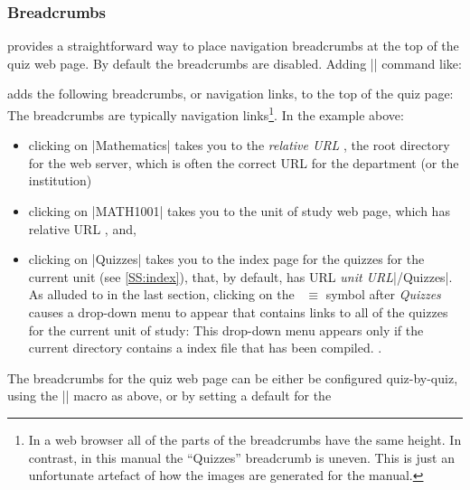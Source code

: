\documentclass[svgnames]{article}
\makeatletter
\newcommand\macroIndex[1]{%
  \lowercase{\def\temp{#1}}%
  \expandafter\index\expandafter{\temp@\textbackslash#1}%
}
\makeatother
\begin{document}
    \subsubsection{Breadcrumbs}\label{SS:breadcrumbs}

    \WebQuiz provides a straightforward way to place navigation breadcrumbs
    at the top of the quiz web page. By default the
    breadcrumbs are disabled. Adding \LatexCode|\BreadCrumbs| command
    like:
    \begin{latexcode}
    \end{latexcode}
    adds the following breadcrumbs, or navigation links,
    to the top of the quiz page:
    The breadcrumbs are typically navigation links\footnote{In a web browser all of the
    parts of the breadcrumbs have the same height. In contrast, in this
    manual the ``Quizzes'' breadcrumb is uneven. This is just an
    unfortunate artefact of how the images are generated for the manual.}.
    In the example above:
    \begin{itemize}
      \item clicking on \BashCode|Mathematics| takes you to the
      \textit{relative URL} \BashCode{/}, the root directory for the web
      server, which is often the correct URL for the department (or the
      institution)
      \item clicking on
      \BashCode|MATH1001| takes you to the
      unit of study web page, which has relative URL , and,
      \item clicking on \BashCode|Quizzes| takes you to the index page for
      the quizzes for the current unit (see \autoref{SS:index}), that, by
      default, has URL \textit{unit URL}\BashCode|/Quizzes|.  As alluded
      to in the last section, clicking on the~{\large\color{red} $\equiv$}
      symbol after \textit{Quizzes} causes a drop-down menu to appear that
      contains links to all of the quizzes for the current unit of study:
      This drop-down menu appears only if the current directory
      contains a \WebQuiz index file that has been compiled.
      .
    \end{itemize}
    The breadcrumbs for the quiz web page can be either be configured
    quiz-by-quiz, using the \LatexCode|\BreadCrumbs| macro
    \macroIndex{BreadCrumbs} as above, or by setting a default for the
\end{document}
